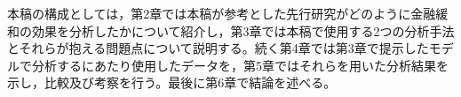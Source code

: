 \documentclass[12pt]{jarticle}
\begin{document}
{%
本稿の構成としては，第2章では本稿が参考とした先行研究がどのように金融緩和の効果を分析したかについて紹介し，第3章では本稿で使用する2つの分析手法とそれらが抱える問題点について説明する。続く第4章では第3章で提示したモデルで分析するにあたり使用したデータを，第5章ではそれらを用いた分析結果を示し，比較及び考察を行う。最後に第6章で結論を述べる。

\newpage










}
\end{document}
